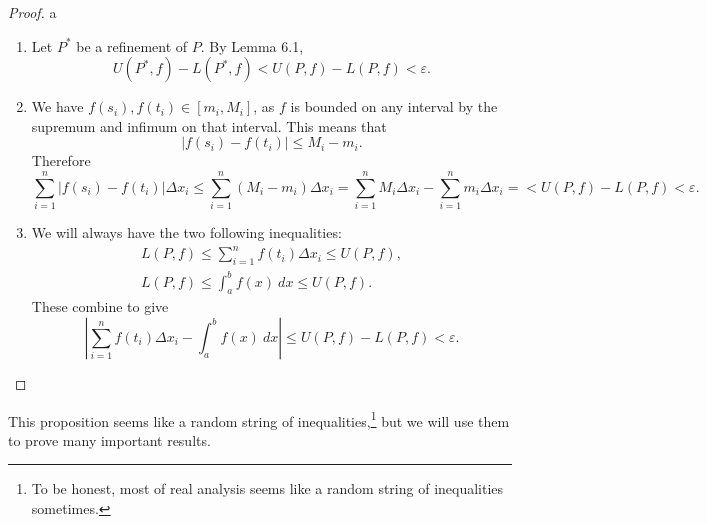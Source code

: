 \documentclass{article}
\theoremstyle{definition}
\begin{document}
\begin{proof}{\color{white}a}
\begin{enumerate}
	\item Let $ P^* $ be a refinement of $ P $. By Lemma 6.1, $$U(P^*,f)-L(P^*,f)<U(P,f)-L(P,f)<\varepsilon .$$ 
	\item We have $ f(s_i),f(t_i)\in[m_i,M_i] $, as $ f $ is bounded on any interval by the supremum and infimum on that interval. This means that $$|f(s_i)-f(t_i)|\le M_i-m_i .$$ Therefore $$\sum_{i=1}^n|f(s_i)-f(t_i)|\Delta x_i\le\sum_{i=1}^n(M_i-m_i)\Delta x_i=\sum_{i=1}^n M_i\Delta x_i-\sum_{i=1}^n m_i\Delta x_i=<U(P,f)-L(P,f)<\varepsilon. $$
	\item We will always have the two following inequalities:
	\begin{align*}
		L(P,f)\le\sum_{i=1}^nf(t_i) \Delta x_i\le U(P,f),\\
		L(P,f)\le\int_{a}^{b}f(x)\ dx\le U(P,f).
	\end{align*}
	These combine to give $$  \left\lvert \sum_{i=1}^nf(t_i)\Delta x_i-\int_{a}^{b}f(x)\ dx\right\rvert\le U(P,f)-L(P,f)<\varepsilon. $$
\end{enumerate}
\end{proof}
This proposition seems like a random string of inequalities,\footnote{To be honest, most of real analysis seems like a random string of inequalities sometimes.} but we will use them to prove many important results.
\end{document}
